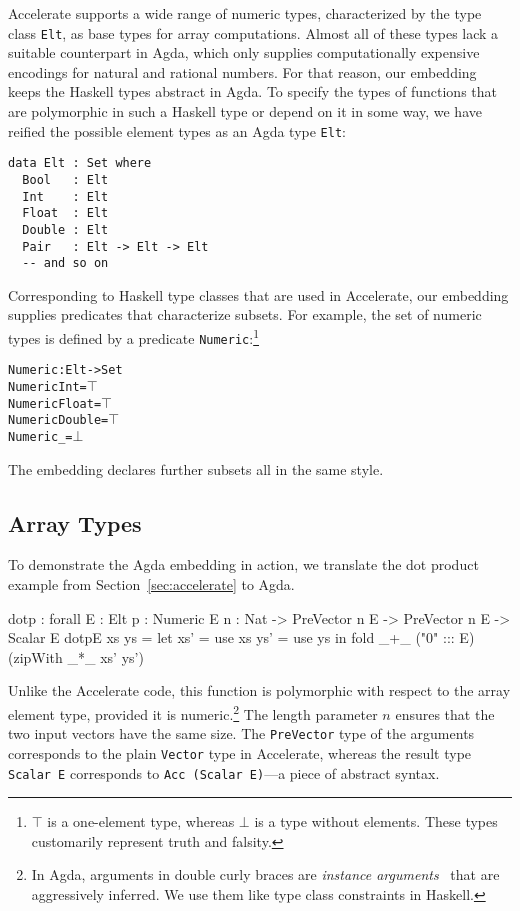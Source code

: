\documentclass{llncs}
\begin{document}
Accelerate supports a wide range of numeric types, characterized by
the type class \texttt{Elt}, as base types for
array computations. Almost all of these types lack a suitable
counterpart in Agda, which only supplies  computationally expensive
encodings for natural and rational numbers. For that reason, our embedding keeps the Haskell types 
abstract in Agda. To specify the types of functions that are polymorphic in such a Haskell type or depend on it
in some way, we have reified the possible element types as an Agda type
\texttt{Elt}:
\begin{verbatim}
data Elt : Set where
  Bool   : Elt
  Int    : Elt
  Float  : Elt
  Double : Elt
  Pair   : Elt -> Elt -> Elt
  -- and so on
\end{verbatim}
Corresponding to Haskell type classes that are used in Accelerate, our
embedding supplies predicates that characterize subsets. For example,
the set of numeric types is defined by a predicate
\texttt{Numeric}:\footnote{$\top$ is a one-element type,
  whereas $\bot$ is a type without elements. These types customarily
  represent truth and falsity.}
\begin{alltt}
Numeric : Elt -> Set
Numeric Int = \(\top\)
Numeric Float = \(\top\)
Numeric Double = \(\top\)
Numeric _ = \(\bot\)
\end{alltt}
The embedding declares further subsets all in the same style.

\subsection{Array Types}
\label{sec:array-types}

To demonstrate the Agda embedding in action, we translate the
dot product example from Section~\ref{sec:accelerate} to Agda.
\begin{code}
dotp : forall {E : Elt} {{p : Numeric E}} {n : Nat}
     -> PreVector n E -> PreVector n E -> Scalar E
dotp{E} xs ys = 
  let xs' = use xs
      ys' = use ys
  in  fold _+_ ("0" ::: E) (zipWith _*_ xs' ys')
\end{code}
Unlike the Accelerate code, this function is polymorphic with respect
to the array element type, provided it is numeric.\footnote{In Agda,
  arguments in double curly braces are \emph{instance
    arguments}~\cite{DevriesePiessens2011} that are aggressively
  inferred. We use them like type class constraints in Haskell.}
The length parameter $n$ ensures that the two input
vectors have the same size. The \texttt{PreVector} type of the
arguments corresponds to the plain \texttt{Vector} type in Accelerate,
whereas the result type \texttt{Scalar E} corresponds to \texttt{Acc
  (Scalar E)}---a piece of abstract syntax. 
\end{document}
